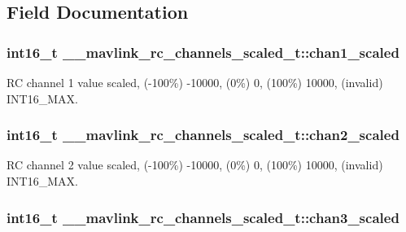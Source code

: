 \subsection{Field Documentation}
\hypertarget{struct____mavlink__rc__channels__scaled__t_a2d350897e12b0008208e61a031f01270}{
\subsubsection[{chan1\+\_\+scaled}]{\setlength{\rightskip}{0pt plus 5cm}int16\+\_\+t \+\_\+\+\_\+mavlink\+\_\+rc\+\_\+channels\+\_\+scaled\+\_\+t\+::chan1\+\_\+scaled}}\label{struct____mavlink__rc__channels__scaled__t_a2d350897e12b0008208e61a031f01270}


R\+C channel 1 value scaled, (-\/100\%) -\/10000, (0\%) 0, (100\%) 10000, (invalid) I\+N\+T16\+\_\+\+M\+A\+X. 

\hypertarget{struct____mavlink__rc__channels__scaled__t_a8ca88934095102f7195b4e5ab88ecd5c}{
\subsubsection[{chan2\+\_\+scaled}]{\setlength{\rightskip}{0pt plus 5cm}int16\+\_\+t \+\_\+\+\_\+mavlink\+\_\+rc\+\_\+channels\+\_\+scaled\+\_\+t\+::chan2\+\_\+scaled}}\label{struct____mavlink__rc__channels__scaled__t_a8ca88934095102f7195b4e5ab88ecd5c}


R\+C channel 2 value scaled, (-\/100\%) -\/10000, (0\%) 0, (100\%) 10000, (invalid) I\+N\+T16\+\_\+\+M\+A\+X. 

\hypertarget{struct____mavlink__rc__channels__scaled__t_a1f6f236dabbe2174233f2bf4e16f3c7d}{
\subsubsection[{chan3\+\_\+scaled}]{\setlength{\rightskip}{0pt plus 5cm}int16\+\_\+t \+\_\+\+\_\+mavlink\+\_\+rc\+\_\+channels\+\_\+scaled\+\_\+t\+::chan3\+\_\+scaled}}\label{struct____mavlink__rc__channels__scaled__t_a1f6f236dabbe2174233f2bf4e16f3c7d}


